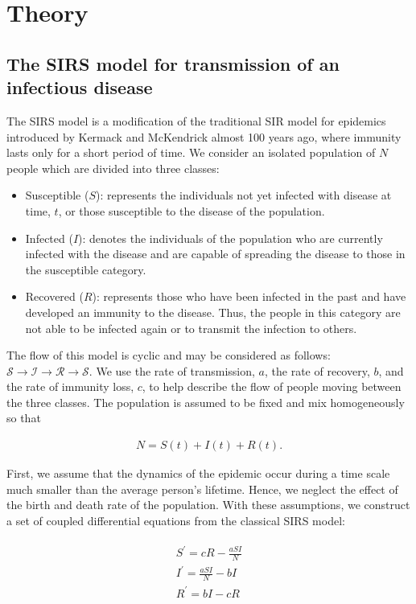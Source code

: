 \documentclass[../main.tex]{subfiles}
\begin{document}
\section{Theory}\label{sec:theory}
\subsection{The SIRS model for transmission of an infectious disease}
The SIRS model is a modification of the traditional SIR model for epidemics introduced by Kermack and McKendrick \cite{SIRmodel} almost 100 years ago, where immunity lasts only for a short period of time. We consider an isolated population of $N$ people which are divided into three classes: 

\begin{itemize}
    \item Susceptible ($S$): represents the individuals not yet infected with disease at time, $t$, or those susceptible to the disease of the population. 
    \item Infected ($I$): denotes the individuals of the population who are currently infected with the disease and are capable of spreading the disease to those in the susceptible category. 
    \item Recovered ($R$): represents those who have been infected in the past and have developed an immunity to the disease. Thus, the people in this category are not able to be infected again or to transmit the infection to others. 
\end{itemize}

The flow of this model is cyclic and may be considered as follows: 
\ensuremath{\mathcal{S}\rightarrow\mathcal{I}\rightarrow\mathcal{R}\rightarrow\mathcal{S}}. We use the rate of transmission, $a$, the rate of recovery, $b$, and the rate of immunity loss, $c$, to help describe the flow of people moving between the three classes. The population is assumed to be fixed and mix homogeneously so that

\begin{align}
    N=S(t)+I(t)+R(t).
    \label{eq:N}
\end{align}

First, we assume that the dynamics of the epidemic occur during a time scale much smaller than the average person's lifetime. Hence, we neglect the effect of the birth and death rate of the population. With these assumptions, we construct a set of coupled differential equations from the classical SIRS model:  

\begin{align}
\begin{split}
    S^{'}=cR-\frac{aSI}{N} \\
    I^{'}=\frac{aSI}{N}-bI \\
    R^{'}=bI-cR
\end{split}
\label{eq:SIRS}
\end{align}
\end{document}
